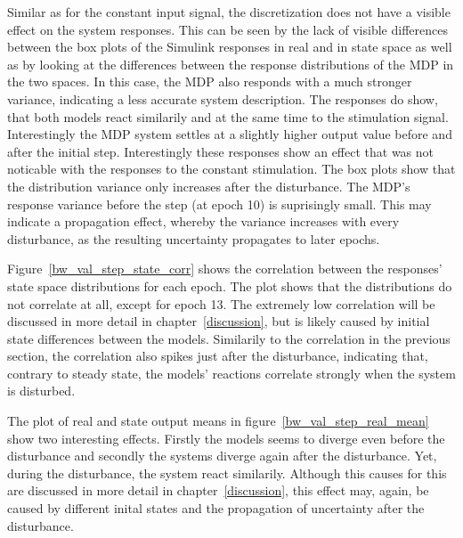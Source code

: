 Similar as for the constant input signal, the discretization does not have a visible effect on the system responses. This can be seen by the lack of visible differences between the box plots of the Simulink responses in real and in state space as well as by looking at the differences between the response distributions of the MDP in the two spaces. In this case, the MDP also responds with a much stronger variance, indicating a less accurate system description. The responses do show, that both models react similarily and at the same time to the stimulation signal. Interestingly the MDP system settles at a slightly higher output value before and after the initial step. Interestingly these responses show an effect that was not noticable with the responses to the constant stimulation. The box plots show that the distribution variance only increases after the disturbance. The MDP's response variance before the step (at epoch 10) is suprisingly small. This may indicate a propagation effect, whereby the variance increases with every disturbance, as the resulting uncertainty propagates to later epochs.

Figure~\ref{bw_val_step_state_corr} shows the correlation between the responses' state space distributions for each epoch. The plot shows that the distributions do not correlate at all, except for epoch 13. The extremely low correlation will be discussed in more detail in chapter~\ref{discussion}, but is likely caused by initial state differences between the models. Similarily to the correlation in the previous section, the correlation also spikes just after the disturbance, indicating that, contrary to steady state, the models' reactions correlate strongly when the system is disturbed.

The plot of real and state output means in figure~\ref{bw_val_step_real_mean} show two interesting effects. Firstly the models seems to diverge even before the disturbance and secondly the systems diverge again after the disturbance. Yet, during the disturbance, the system react similarily. Although this causes for this are discussed in more detail in chapter~\ref{discussion}, this effect may, again, be caused by different inital states and the propagation of uncertainty after the disturbance.










